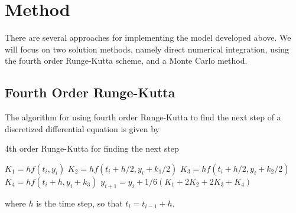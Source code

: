 \documentclass[notitlepage, reprint, nofootinbib]{revtex4-1}
\begin{document}
\section{Method}
There are several approaches for implementing the model developed above. We will focus on two solution methods, namely direct numerical integration, using the fourth order Runge-Kutta scheme, and a Monte Carlo method.
\subsection{Fourth Order Runge-Kutta}
The algorithm for using fourth order Runge-Kutta to find the next step of a discretized differential equation is given by\cite{Langtangen}
\begin{algorithm}[H]
	\caption{4th order Runge-Kutta for finding the next step}
	\begin{algorithmic}[1]
		\State $K_1=hf(t_i, y_i)$
		\State $K_2 = hf(t_i+h/2, y_i+k_1/2)$
		\State $K_3 =hf(t_i+h/2, y_i+k_2/2)$ 
		\State $K_4 = hf(t_i+h, y_i+k_3)$
		\State $y_{i+1}=y_i+1/6(K_1+2K_2+2K_3+K_4)$
	\end{algorithmic}
\end{algorithm}
where $h$ is the time step, so that $t_i=t_{i-1}+h$.
\end{document}
